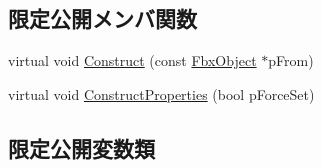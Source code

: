 \subsection*{限定公開メンバ関数}
\begin{DoxyCompactItemize}
\item 
virtual void \hyperlink{class_fbx_global_settings_a81b462c1a0102da73f5d3678ed85d7c9}{Construct} (const \hyperlink{class_fbx_object}{Fbx\+Object} $\ast$p\+From)
\item 
virtual void \hyperlink{class_fbx_global_settings_a68f3fbfa989be5e5f37040c7a780232b}{Construct\+Properties} (bool p\+Force\+Set)
\end{DoxyCompactItemize}
\subsection*{限定公開変数類}
